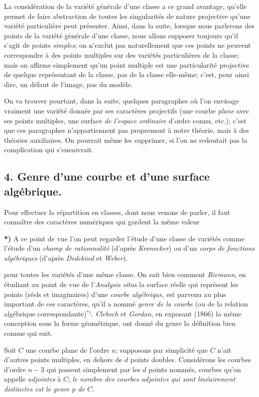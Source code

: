 \documentclass{article}
\begin{document}
La considération de la variété générale d'une classe a ce grand avantage, qu'elle permet de faire abstraction de toutes les singularités de nature projective qu'une variété particulière peut présenter. Ainsi, dans la suite, lorsque nous parlerons des points de la variété générale d'une classe, nous allons supposer toujours qu'il s'agit de points \emph{simples}; on n'exclut pas naturellement que ces points ne peuvent correspondre à des points multiples sur des variétés particulières de la classe; mais on affirme simplement qu'un point multiple est une particularité projective de quelque représentant de la classe, pas de la classe elle-même; c'est, pour ainsi dire, un défaut de l'image, pas du modèle.

On va trouver pourtant, dans la suite, quelques paragraphes où l'on envisage vraiment une variété donnée par ses caractères projectifs (une courbe \emph{plane} avec ses points multiples, une surface \emph{de l'espace ordinaire} d'ordre connu, etc.); c'est que ces paragraphes n'appartiennent pas proprement à notre théorie, mais à des théories auxiliaires. On pourrait même les supprimer, si l'on ne redoutait pas la complication qui s'ensuivrait.

\subsection*{4. Genre d'une courbe et d'une surface algébrique.}

Pour effectuer la répartition en classes, dont nous venons de parler, il faut connaître des caractères numériques qui gardent la même valeur

\textbf{*)} A ce point de vue l'on peut regarder l'étude d'une classe de variétés comme l'étude d'un \emph{champ de rationnalité} (d'après \emph{Kronecker}) ou d'un \emph{corps de fonctions algébriques} (d'après \emph{Dedekind} et \emph{Weber}).

pour toutes les variétés d'une même classe. On sait bien comment \emph{Riemann}, en étudiant au point de vue de l'\emph{Analysis situs} la surface réelle qui représent les points (réels et imaginaires) d'une \emph{courbe algébrique}, est parvenu au plus important de ces caractères, qu'il a nommé \emph{genre de la courbe} (ou de la relation algébrique correspondante)${}^{*)}$. \emph{Clebsch} et \emph{Gordan}, en exposant (1866) la même conception sous la forme géométrique, ont donné du genre la définition bien connue qui suit.

Soit $C$ une courbe plane de l'ordre $n$; supposons par simplicité que $C$ n'ait d'autres points multiples, en dehors de $d$ points doubles. Considérons les courbes d'ordre $n-3$ qui passent simplement par les $d$ points nommés, courbes qu'on appelle \emph{adjointes} à $C$; \emph{le nombre des courbes adjointes qui sont linéairement distinctes est le genre $p$ de $C$.}
\end{document}
